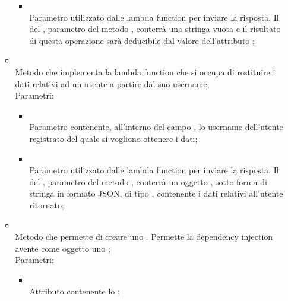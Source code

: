 \begin{itemize}
\begin{itemize}
\begin{itemize}
			\item {} \\
			Parametro utilizzato dalle lambda function per inviare la risposta. Il  del , parametro del metodo , conterrà una stringa vuota e il risultato di questa operazione sarà deducibile dal valore dell'attributo ;
		\end{itemize}
		\item[]  \\
		Metodo che implementa la lambda function che si occupa di restituire i dati relativi ad un utente a partire dal suo username;\\
		Parametri:
		\begin{itemize}
			\item {} \\
			Parametro contenente, all'interno del campo , lo username dell'utente registrato del quale si vogliono ottenere i dati;
			\item {} \\
			Parametro utilizzato dalle lambda function per inviare la risposta. Il  del , parametro del metodo , conterrà un oggetto , sotto forma di stringa in formato JSON, di tipo , contenente i dati relativi all'utente ritornato;
		\end{itemize}
		\item[]  \\
		Metodo che permette di creare uno . Permette la dependency injection avente come oggetto uno ;\\
		Parametri:
		\begin{itemize}
			\item {} \\
			Attributo contenente lo ;
		\end{itemize}
	\end{itemize}
\end{itemize}

